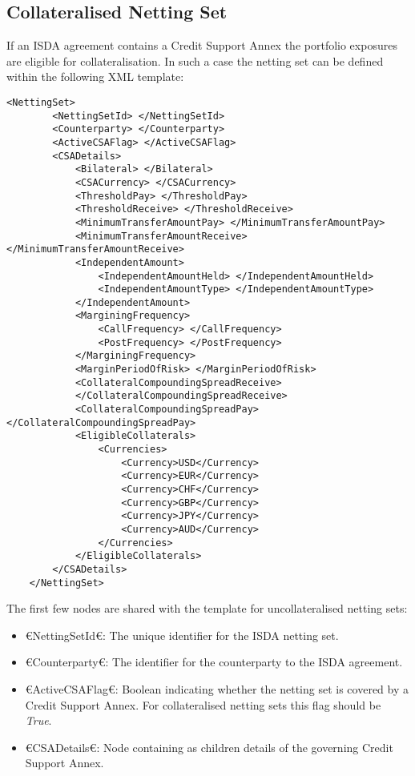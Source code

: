 \subsection{Collateralised Netting Set}
If an ISDA agreement contains a Credit Support Annex the
portfolio exposures are eligible for collateralisation. In such a
case the netting set can be defined within the following XML template:

\begin{lstlisting}[caption={collateralised netting set definition}, label=lst:nettingSetCollat]
    <NettingSet>
        <NettingSetId> </NettingSetId>
        <Counterparty> </Counterparty>
        <ActiveCSAFlag> </ActiveCSAFlag>
        <CSADetails>
            <Bilateral> </Bilateral>
            <CSACurrency> </CSACurrency>
            <ThresholdPay> </ThresholdPay>
            <ThresholdReceive> </ThresholdReceive>
            <MinimumTransferAmountPay> </MinimumTransferAmountPay>
            <MinimumTransferAmountReceive> </MinimumTransferAmountReceive>
            <IndependentAmount>
                <IndependentAmountHeld> </IndependentAmountHeld>
                <IndependentAmountType> </IndependentAmountType>
            </IndependentAmount>
            <MarginingFrequency>
                <CallFrequency> </CallFrequency>
                <PostFrequency> </PostFrequency>
            </MarginingFrequency>
            <MarginPeriodOfRisk> </MarginPeriodOfRisk>
            <CollateralCompoundingSpreadReceive> 
            </CollateralCompoundingSpreadReceive>
            <CollateralCompoundingSpreadPay> </CollateralCompoundingSpreadPay>
            <EligibleCollaterals>
                <Currencies>
                    <Currency>USD</Currency>
                    <Currency>EUR</Currency>
                    <Currency>CHF</Currency>
                    <Currency>GBP</Currency>
                    <Currency>JPY</Currency>
                    <Currency>AUD</Currency>
                </Currencies>
            </EligibleCollaterals>
        </CSADetails>
    </NettingSet>
\end{lstlisting}

The first few nodes are shared with the template for uncollateralised
netting sets:
\begin{itemize}
\item €NettingSetId€: The unique identifier for the ISDA netting set.
\item €Counterparty€: The identifier for the counterparty to the ISDA agreement.
\item €ActiveCSAFlag€: Boolean indicating whether the netting set is
  covered by a Credit Support Annex. For collateralised netting sets
  this flag should be \emph{True}.
\item €CSADetails€: Node containing as children details of the governing
  Credit Support Annex. 
\end{itemize}

